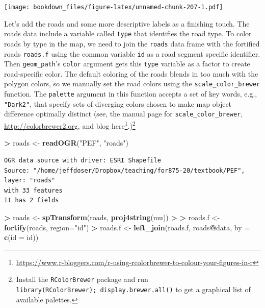 \documentclass[
]{krantz}
\makeatletter
\newenvironment{Shaded}{\begin{snugshade}}{\end{snugshade}}
\newcommand{\DataTypeTok}[1]{\textcolor[rgb]{0.27,0.27,0.27}{#1}}
\newcommand{\ErrorTok}[1]{\textcolor[rgb]{0.14,0.14,0.14}{\textbf{#1}}}
\newcommand{\KeywordTok}[1]{\textcolor[rgb]{0.27,0.27,0.27}{\textbf{#1}}}
\newcommand{\NormalTok}[1]{#1}
\newcommand{\OperatorTok}[1]{\textcolor[rgb]{0.43,0.43,0.43}{\textbf{#1}}}
\newcommand{\StringTok}[1]{\textcolor[rgb]{0.5,0.5,0.5}{#1}}
\renewcommand{\href}[2]{#2\footnote{\url{#1}}}
\newenvironment{kframe}{%
\medskip{}
\setlength{\fboxsep}{.8em}
 \def\at@end@of@kframe{}%
 \ifinner\ifhmode%
  \def\at@end@of@kframe{\end{minipage}}%
  \begin{minipage}{\columnwidth}%
 \fi\fi%
 \def\FrameCommand##1{\hskip\@totalleftmargin \hskip-\fboxsep
 \colorbox{shadecolor}{##1}\hskip-\fboxsep
     \hskip-\linewidth \hskip-\@totalleftmargin \hskip\columnwidth}%
 \MakeFramed {\advance\hsize-\width
   \@totalleftmargin\z@ \linewidth\hsize
   \@setminipage}}%
 {\par\unskip\endMakeFramed%
 \at@end@of@kframe}
\renewenvironment{Shaded}{\begin{kframe}}{\end{kframe}}
\makeatother
\begin{document}
\texttt{[image: bookdown\_files/figure-latex/unnamed-chunk-207-1.pdf]}

Let's add the roads and some more descriptive labels as a finishing touch. The roads data include a variable called \texttt{type} that identifies the road type. To color roads by type in the map, we need to join the \texttt{roads} data frame with the fortified roads \texttt{roads.f} using the common variable \texttt{id} as a road segment specific identifier. Then \texttt{geom\_path}'s \texttt{color} argument gets this \texttt{type} variable as a factor to create road-specific color. The default coloring of the roads blends in too much with the polygon colors, so we manually set the road colors using the \texttt{scale\_color\_brewer} function. The \texttt{palette} argument in this function accepts a set of key words, e.g., \texttt{"Dark2"}, that specify sets of diverging colors chosen to make map object difference optimally distinct (see, the manual page for \texttt{scale\_color\_brewer}, \url{http://colorbrewer2.org}, and blog \href{https://www.r-bloggers.com/r-using-rcolorbrewer-to-colour-your-figures-in-r}{here}.)\footnote{Install the \texttt{RColorBrewer} package and run \texttt{library(RColorBrewer);\ display.brewer.all()} to get a graphical list of available palettes.}

\begin{Shaded}
\begin{Highlighting}[]
\OperatorTok{\textgreater{}}\StringTok{ }\NormalTok{roads \textless{}{-}}\StringTok{ }\KeywordTok{readOGR}\NormalTok{(}\StringTok{"PEF"}\NormalTok{, }\StringTok{"roads"}\NormalTok{)}
\end{Highlighting}
\end{Shaded}

\begin{verbatim}
OGR data source with driver: ESRI Shapefile 
Source: "/home/jeffdoser/Dropbox/teaching/for875-20/textbook/PEF", layer: "roads"
with 33 features
It has 2 fields
\end{verbatim}

\begin{Shaded}
\begin{Highlighting}[]
\OperatorTok{\textgreater{}}\StringTok{ }\NormalTok{roads \textless{}{-}}\StringTok{ }\KeywordTok{spTransform}\NormalTok{(roads, }\KeywordTok{proj4string}\NormalTok{(mu))}
\OperatorTok{\textgreater{}}\StringTok{ }
\ErrorTok{\textgreater{}}\StringTok{ }\NormalTok{roads.f \textless{}{-}}\StringTok{ }\KeywordTok{fortify}\NormalTok{(roads, }\DataTypeTok{region=}\StringTok{"id"}\NormalTok{)}
\OperatorTok{\textgreater{}}\StringTok{ }\NormalTok{roads.f \textless{}{-}}\StringTok{ }\KeywordTok{left\_join}\NormalTok{(roads.f, roads}\OperatorTok{@}\NormalTok{data, }\DataTypeTok{by =} \KeywordTok{c}\NormalTok{(}\StringTok{\textquotesingle{}id\textquotesingle{}}\NormalTok{ =}\StringTok{ \textquotesingle{}id\textquotesingle{}}\NormalTok{))}
\end{Highlighting}
\end{Shaded}
\end{document}
